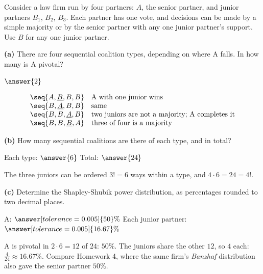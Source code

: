 \documentclass[12pt]{ximera}
\begin{document}
\begin{problem}
Consider a law firm run by four partners: $A$, the senior partner, and junior partners
$B_1$, $B_2$, $B_3$. Each partner has one vote, and decisions can be made by a simple
majority or by the senior partner with any one junior partner's support. Use $B$ for
any one junior partner.

\begin{prompt}
\textbf{(a)} There are four sequential coalition types, depending on where A falls. In
how many is A pivotal?

$\answer{2}$

\begin{feedback}
\[
\begin{array}{ll}
\seq{A,\underline{B},B,B} & \text{A with one junior wins}\\
\seq{B,\underline{A},B,B} & \text{same}\\
\seq{B,B,\underline{A},B} & \text{two juniors are not a majority; A completes it}\\
\seq{B,B,\underline{B},A} & \text{three of four is a majority}
\end{array}
\]
\end{feedback}
\end{prompt}

\begin{prompt}
\textbf{(b)} How many sequential coalitions are there of each type, and in total?

Each type: $\answer{6}$ \qquad Total: $\answer{24}$

\begin{feedback}
The three juniors can be ordered $3!=6$ ways within a type, and $4\cdot 6=24=4!$.
\end{feedback}
\end{prompt}

\begin{prompt}
\textbf{(c)} Determine the Shapley-Shubik power distribution, as percentages rounded to
two decimal places.

A: $\answer[tolerance=0.005]{50}\%$ \quad Each junior partner:
$\answer[tolerance=0.005]{16.67}\%$

\begin{feedback}
A is pivotal in $2\cdot 6=12$ of $24$: $50\%$. The juniors share the other $12$, so $4$
each: $\frac{4}{24}\approx 16.67\%$. Compare Homework 4, where the same firm's
\emph{Banzhaf} distribution also gave the senior partner $50\%$.
\end{feedback}
\end{prompt}
\end{problem}
\end{document}
